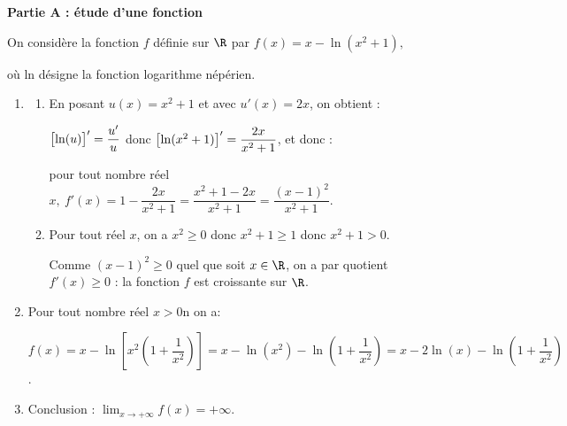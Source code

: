 
\medskip

\begin{center}\textbf{Partie A : étude d'une fonction} \end{center}

On considère la fonction $f$ définie sur $\R$ par 
$f(x) = x - \ln \left(x^2 + 1\right),$

où ln désigne la fonction logarithme népérien.

\medskip

\begin{enumerate}
\item %
	\begin{enumerate}
		\item %
En posant $u(x) = x^2 + 1$ et avec $u'(x) = 2x$, on obtient :

$\left [\ln (u)\strut \right ]' = \dfrac{u'}{u}$ donc $\left [\ln (x^2+1)\strut \right ]' = \dfrac{2x}{x^2+ 1}$, et donc :

pour tout nombre réel $x, \: f'(x) = 1 - \dfrac{2x}{x^2+ 1} = \dfrac{x^2 + 1 - 2x}{x^2 + 1} =  \dfrac{(x - 1)^2}{ x^2 + 1}$.

		\item %
Pour tout réel $x$, on a $x^2 \geqslant 0$ donc $x^2 + 1\geqslant 1$ donc $x^2 + 1 > 0$.

Comme $(x - 1)^2 \geqslant 0$ quel que soit $x \in \R$, on a par quotient $f'(x) \geqslant 0$ : la fonction $f$ est croissante sur $\R$.
	\end{enumerate}
\item %
Pour tout nombre réel  $x > 0$n on a:

$f(x) =  x - \ln \left[x^2\left(1 + \dfrac{1}{x^2}\right)\right] = x - \ln (x^2) - \ln \left(1 + \dfrac{1}{x^2}\right) = x - 2 \ln(x) - \ln \left(1 + \dfrac{1}{x^2}\right)$. 

\item %

Conclusion : $\displaystyle\lim_{x \to + \infty}f(x) = + \infty$.
\end{enumerate}

